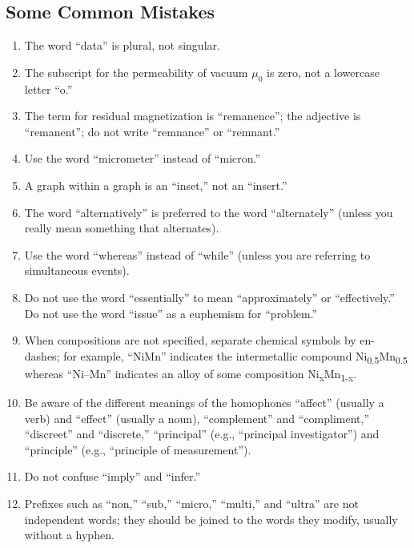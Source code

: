 \subsection{Some Common Mistakes}
\begin{enumerate}
	\item The word ``data'' is plural, not singular. 
	
	\item The subscript for the permeability of vacuum $\mu_0$ is zero, not a lowercase letter ``o.''
	
	\item The term for residual magnetization is ``remanence''; the adjective is ``remanent''; do not write ``remnance'' or ``remnant.'' 
	
	\item Use the word ``micrometer'' instead of ``micron.'' 
	
	\item A graph within a graph is an ``inset,'' not an ``insert.'' 
	
	\item The word ``alternatively'' is preferred to the word ``alternately'' (unless you really mean something that alternates). 
	
	\item Use the word ``whereas'' instead of ``while'' (unless you are referring to simultaneous events). 
	
	\item Do not use the word ``essentially'' to mean ``approximately'' or ``effectively.'' Do not use the word ``issue'' as a euphemism for ``problem.'' 
	
	\item When compositions are not specified, separate chemical symbols by en-dashes; for example, ``NiMn'' indicates the intermetallic compound Ni\textsubscript{0.5}Mn\textsubscript{0.5} whereas ``Ni–Mn'' indicates an alloy of some composition Ni\textsubscript{x}Mn\textsubscript{1-x}.

	\item Be aware of the different meanings of the homophones ``affect'' (usually a verb) and ``effect'' (usually a noun), ``complement'' and ``compliment,'' ``discreet'' and ``discrete,'' ``principal'' (e.g., ``principal investigator'') and ``principle'' (e.g., ``principle of measurement''). 
	
	\item Do not confuse ``imply'' and ``infer.'' 

	\item Prefixes such as ``non,'' ``sub,'' ``micro,'' ``multi,'' and ``ultra'' are not independent words; they should be joined to the words they modify, usually without a hyphen. 
	

\end{enumerate}

